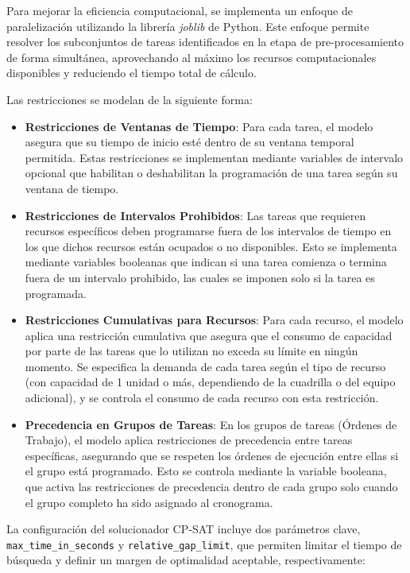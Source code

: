 \documentclass{article}
\begin{document}
Para mejorar la eficiencia computacional, se implementa un enfoque de paralelización utilizando la librería \textit{joblib} de Python. Este enfoque permite resolver los subconjuntos de tareas identificados en la etapa de pre-procesamiento de forma simultánea, aprovechando al máximo los recursos computacionales disponibles y reduciendo el tiempo total de cálculo.

Las restricciones se modelan de la siguiente forma:

\begin{itemize}
    \item \textbf{Restricciones de Ventanas de Tiempo}: Para cada tarea, el modelo asegura que su tiempo de inicio esté dentro de su ventana temporal permitida. Estas restricciones se implementan mediante variables de intervalo opcional que habilitan o deshabilitan la programación de una tarea según su ventana de tiempo.

    \item \textbf{Restricciones de Intervalos Prohibidos}: Las tareas que requieren recursos específicos deben programarse fuera de los intervalos de tiempo en los que dichos recursos están ocupados o no disponibles. Esto se implementa mediante variables booleanas que indican si una tarea comienza o termina fuera de un intervalo prohibido, las cuales se imponen solo si la tarea es programada.

    \item \textbf{Restricciones Cumulativas para Recursos}: Para cada recurso, el modelo aplica una restricción cumulativa que asegura que el consumo de capacidad por parte de las tareas que lo utilizan no exceda su límite en ningún momento. Se especifica la demanda de cada tarea según el tipo de recurso (con capacidad de 1 unidad o más, dependiendo de la cuadrilla o del equipo adicional), y se controla el consumo de cada recurso con esta restricción.

    \item \textbf{Precedencia en Grupos de Tareas}: En los grupos de tareas (Órdenes de Trabajo), el modelo aplica restricciones de precedencia entre tareas específicas, asegurando que se respeten los órdenes de ejecución entre ellas si el grupo está programado. Esto se controla mediante la variable booleana, que activa las restricciones de precedencia dentro de cada grupo solo cuando el grupo completo ha sido asignado al cronograma.
\end{itemize}

La configuración del solucionador CP-SAT incluye dos parámetros clave, \texttt{max\_time\_in\_seconds} y \texttt{relative\_gap\_limit}, que permiten limitar el tiempo de búsqueda y definir un margen de optimalidad aceptable, respectivamente:
\end{document}
